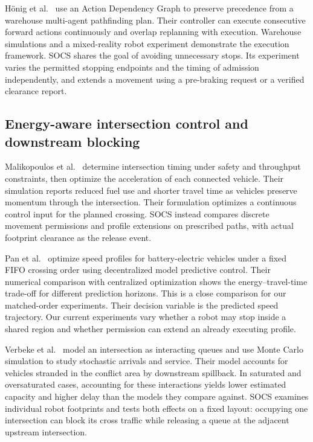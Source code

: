 \documentclass[11pt,a4paper]{article}
\begin{document}
H\"onig et al.~\cite{hoenig2019} use an Action Dependency Graph to preserve
precedence from a warehouse multi-agent pathfinding plan. Their controller
can execute consecutive forward actions continuously and overlap replanning
with execution. Warehouse simulations and a mixed-reality robot experiment
demonstrate the execution framework. SOCS shares the goal of avoiding
unnecessary stops. Its experiment varies the permitted stopping endpoints and
the timing of admission independently, and extends a movement using a
pre-braking request or a verified clearance report.

\subsection{Energy-aware intersection control and downstream blocking}
Malikopoulos et al.~\cite{malikopoulos2018} determine intersection timing
under safety and throughput constraints, then optimize the acceleration of
each connected vehicle. Their simulation reports reduced fuel use and shorter
travel time as vehicles preserve momentum through the intersection. Their
formulation optimizes a continuous control input for the planned crossing.
SOCS instead compares discrete movement permissions and profile extensions
on prescribed paths, with actual footprint clearance as the release event.

Pan et al.~\cite{pan2021} optimize speed profiles for battery-electric
vehicles under a fixed FIFO crossing order using decentralized model predictive
control. Their numerical comparison with centralized optimization shows the
energy--travel-time trade-off for different prediction horizons. This is a
close comparison for our matched-order experiments. Their decision variable
is the predicted speed trajectory. Our current experiments vary whether a
robot may stop inside a shared region and whether permission can extend an
already executing profile.

Verbeke et al.~\cite{verbeke2008} model an intersection as interacting
queues and use Monte Carlo simulation to study stochastic arrivals and service.
Their model accounts for vehicles stranded in the conflict area by downstream
spillback. In saturated and oversaturated cases, accounting for these
interactions yields lower estimated capacity and higher delay than the models
they compare against. SOCS examines individual robot footprints and tests
both effects on a fixed layout: occupying one intersection can block its
cross traffic while releasing a queue at the adjacent upstream intersection.
\end{document}
